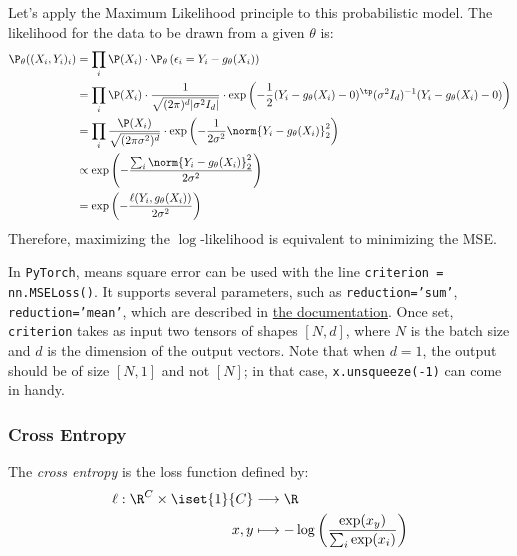 Let's apply the Maximum Likelihood principle to this probabilistic model. The likelihood for the data to be drawn from a given $\theta$ is:
\begin{equation*}
    \begin{aligned}
        \P_\theta((X_i,Y_i)_i)&=\prod_i \P(X_i) \cdot \P_\theta\left(\epsilon_i=Y_i-g_\theta(X_i)\right)\\
        &=\prod_i \P(X_i) \cdot \frac{1}{\sqrt{(2\pi)^d|\sigma^2I_d|}}\cdot\exp\left(-\frac{1}{2}(Y_i-g_\theta(X_i)-0)^\tp(\sigma^2I_d)^{-1}(Y_i-g_\theta(X_i)-0)\right) \\
        &=\prod_i \frac{\P(X_i)}{\sqrt{(2\pi\sigma^2)^d}}\cdot\exp\left(-\frac{1}{2\sigma^2}\norm{Y_i-g_\theta(X_i)}_2^2\right) \\
        &\propto\exp\left(-\frac{\sum_i\norm{Y_i-g_\theta(X_i)}_2^2}{2\sigma^2}\right)\\
        &= \exp\left(-\frac{\ell(Y_i,g_\theta(X_i))}{2\sigma^2}\right)
    \end{aligned}
\end{equation*}
Therefore, maximizing the $\log$-likelihood is equivalent to minimizing the MSE.

In \texttt{PyTorch}, means square error can be used with the line \texttt{criterion = nn.MSELoss()}. It supports several parameters, such as \texttt{reduction='sum'}, \texttt{reduction='mean'}, which are described in \href{https://pytorch.org/docs/stable/generated/torch.nn.MSELoss.html}{the documentation}. Once set, \texttt{criterion} takes as input two tensors of shapes $[N,d]$, where $N$ is the batch size and $d$ is the dimension of the output vectors. Note that when $d=1$, the output should be of size $[N,1]$ and not $[N]$; in that case, \texttt{x.unsqueeze(-1)} can come in handy.

\subsubsection{Cross Entropy}
\begin{definition}
    The \emph{cross entropy} is the loss function defined by:
    \begin{equation*}
        \begin{aligned}
            \ell : \R^C\times\iset{1}{C}&\longrightarrow\R\\
            x, y&\longmapsto -\log\left(\frac{\exp(x_y)}{\sum_i\exp(x_i)}\right)
        \end{aligned}
    \end{equation*}
\end{definition}

